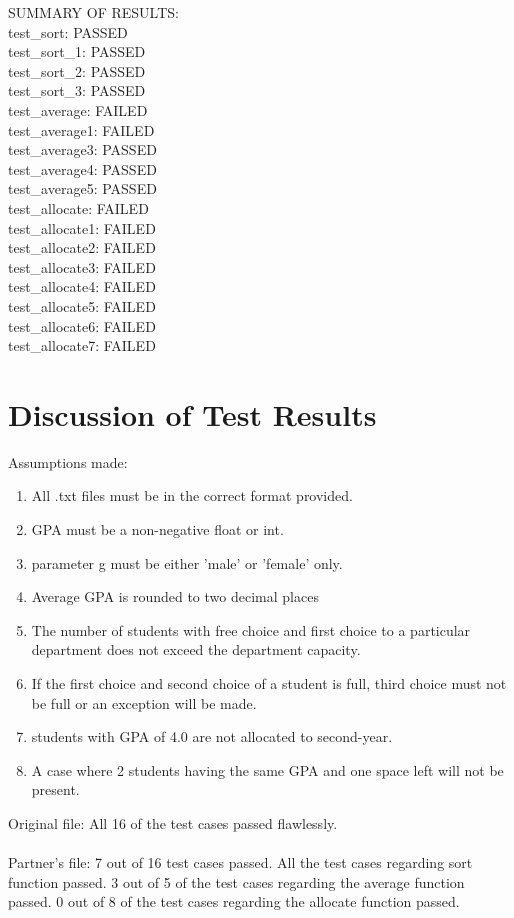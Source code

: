 \documentclass[12pt]{article}
\begin{document}
SUMMARY OF RESULTS:\\
test\_sort: PASSED\\
test\_sort\_1: PASSED\\
test\_sort\_2: PASSED\\
test\_sort\_3: PASSED\\
test\_average: FAILED\\
test\_average1: FAILED\\
test\_average3: PASSED\\
test\_average4: PASSED\\
test\_average5: PASSED\\
test\_allocate: FAILED\\
test\_allocate1: FAILED\\
test\_allocate2: FAILED\\
test\_allocate3: FAILED\\
test\_allocate4: FAILED\\
test\_allocate5: FAILED\\
test\_allocate6: FAILED\\
test\_allocate7: FAILED\\


\section{Discussion of Test Results}
Assumptions made:
\begin{enumerate}[(1)]

\item All .txt files must be in the correct format provided.
\item GPA must be a non-negative float or int.
\item parameter g must be either 'male' or 'female' only.
\item Average GPA is rounded to two decimal places
\item The number of students with free choice and first choice to a particular department does not exceed the department capacity.
\item If the first choice and second choice of a student is full, third choice must not be full or an exception will be made.
\item students with GPA of 4.0 are not allocated to second-year.
\item A case where 2 students having the same GPA and one space left will not be present.       

\end{enumerate}
Original file:
All 16 of the test cases passed flawlessly.\\\\
Partner's file:
7 out of 16 test cases passed. All the test cases regarding sort function passed. 3 out of 5 of the test cases regarding the average function passed. 0 out of 8 of the test cases regarding the allocate function passed.\\ 
\end{document}
